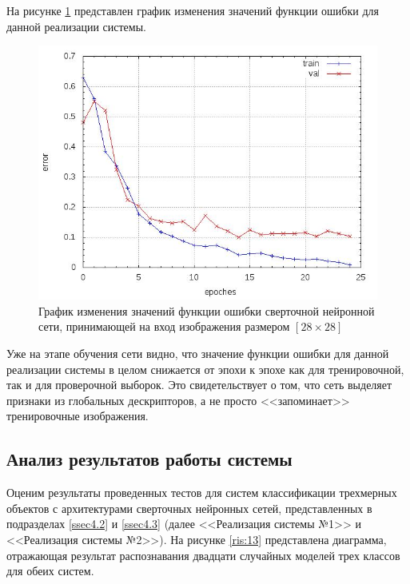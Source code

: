 \documentclass[14pt]{article}
\numberwithin{figure}{section}
\numberwithin{equation}{section}
\begin{document}
На рисунке \ref{ris:12} представлен график изменения значений функции ошибки для данной реализации системы.
\begin{figure}[h]
   \begin{center}
       \includegraphics[scale=0.55] {12.JPG}
       \caption{График изменения значений функции ошибки сверточной нейронной сети, принимающей на вход изображения размером $[28 \times 28]$}
       \label{ris:12}
   \end{center}
\end{figure}
Уже на этапе обучения сети видно, что значение функции ошибки для данной реализации системы в целом снижается от эпохи к эпохе как для тренировочной, так и для проверочной выборок. Это свидетельствует о том, что сеть выделяет признаки из глобальных дескрипторов, а не просто <<запоминает>> тренировочные изображения.

\subsection{Анализ результатов работы системы}\label{ssec4.4}

Оценим результаты проведенных тестов для систем классификации трехмерных объектов с архитектурами сверточных нейронных сетей, представленных в подразделах \ref{ssec4.2} и \ref{ssec4.3} (далее <<Реализация системы №1>> и <<Реализация системы №2>>). На рисунке \ref{ris:13} представлена диаграмма, отражающая результат распознавания двадцати случайных моделей трех классов для обеих систем.
\end{document}
